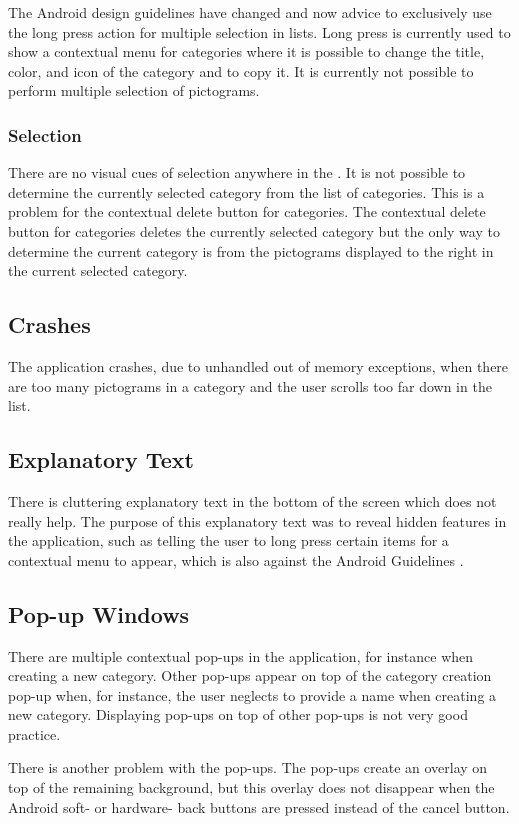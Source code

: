 The Android design guidelines have changed and now advice to exclusively use the long press action for multiple selection in lists. Long press is currently used to show a contextual menu for categories where it is possible to change the title, color, and icon of the category and to copy it. It is currently not possible to perform multiple selection of pictograms. 

\subsubsection{Selection}

There are no visual cues of selection anywhere in the \ct. It is not possible to determine the currently selected category from the list of categories. This is a problem for the contextual delete button for categories. The contextual delete button for categories deletes the currently selected category but the only way to determine the current category is from the pictograms displayed to the right in the current selected category. 

\subsection{Crashes}

The application crashes, due to unhandled out of memory exceptions, when there are too many pictograms in a category and the user scrolls too far down in the list. 

\subsection{Explanatory Text}

There is cluttering explanatory text in the bottom of the screen which does not really help. The purpose of this explanatory text was to reveal hidden features in the application, such as telling the user to long press certain items for a contextual menu to appear, which is also against the Android Guidelines \parencite{android_guidelines_longpress}.

\subsection{Pop-up Windows}

There are multiple contextual pop-ups in the application, for instance when creating a new category. Other pop-ups appear on top of the category creation pop-up when, for instance, the user neglects to provide a name when creating a new category. Displaying pop-ups on top of other pop-ups is not very good practice.

There is another problem with the pop-ups. The pop-ups create an overlay on top of the remaining background, but this overlay does not disappear when the Android soft- or hardware- back buttons are pressed instead of the cancel button. 
